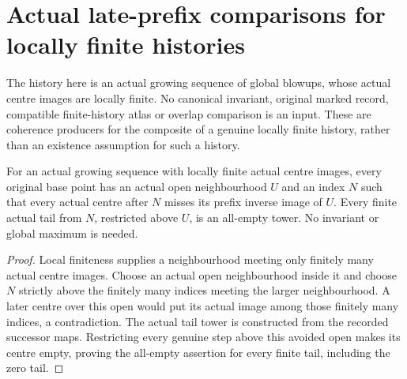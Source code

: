 \section{Actual late-prefix comparisons for locally finite histories}

The history here is an actual growing sequence of global blowups, whose
actual centre images are locally finite. No canonical invariant, original
marked record, compatible finite-history atlas or overlap comparison is an
input. These are coherence producers for the composite of a genuine locally
finite history, rather than an existence assumption for such a history.

\begin{lemma}
\label{hir:actual-locally-finite-history-stabilizing-windows}
\leanok
For an actual growing sequence with locally finite actual centre images,
every original base point has an actual open neighbourhood $U$ and an index
$N$ such that every actual centre after $N$ misses its prefix inverse image
of $U$. Every finite actual tail from $N$, restricted above $U$, is an
all-empty tower. No invariant or global maximum is needed.
\end{lemma}
\begin{proof}
Local finiteness supplies a neighbourhood meeting only finitely many actual
centre images. Choose an actual open neighbourhood inside it and choose
$N$ strictly above the finitely many indices meeting the larger neighbourhood.
A later centre over this open would put its actual image among those finitely
many indices, a contradiction. The actual tail tower is constructed from the
recorded successor maps. Restricting every genuine step above this avoided
open makes its centre empty, proving the all-empty assertion for every finite
tail, including the zero tail.
\end{proof}

